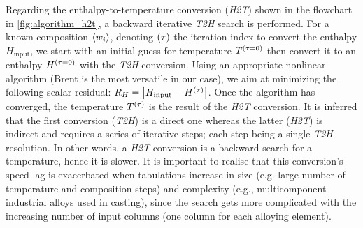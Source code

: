 Regarding the enthalpy-to-temperature conversion (\emph{H2T}) shown in the flowchart in \cref{fig:algorithm_h2t}, 
a backward iterative \emph{T2H} search is performed. 
For a known composition $\langle w_i \rangle$, denoting ${\left( \tau \right)}$ the iteration index to convert the enthalpy 
$H_{\text{input}}$, we start with an initial guess for temperature $T^{{\left( \tau=0 \right)}}$ then convert it to an 
enthalpy $H^{{\left( \tau=0 \right)}}$ with the \emph{T2H} conversion. Using an appropriate nonlinear algorithm (Brent is the most versatile 
in our case), we aim at minimizing the following scalar residual: $R_{H} = \left | H_{\text{input}} - H^{{\left( \tau \right)}}  \right |$. 
Once the algorithm has converged, the temperature $T^{{\left( \tau \right)}}$ is the result of the \emph{H2T} conversion. It is 
inferred that the first conversion (\emph{T2H}) is a direct one whereas the latter (\emph{H2T}) is indirect and requires 
a series of iterative steps; each step being a single \emph{T2H} resolution. In other words, a \emph{H2T} conversion is a 
backward search for a temperature, hence it is slower. It is important to realise that this conversion's speed lag is exacerbated 
when tabulations increase in size (e.g. large number of temperature and composition steps) and complexity (e.g., multicomponent 
industrial alloys used in casting), since the search gets more complicated with the increasing number of input 
columns (one column for each alloying element).

